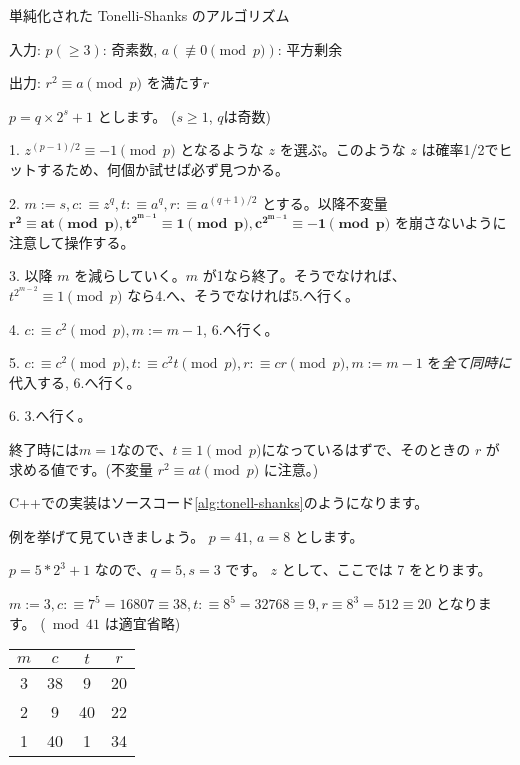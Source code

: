 \documentclass{jsarticle}
\begin{document}
\begin{algorithm}                      
\caption{単純化された Tonelli-Shanks のアルゴリズム}
\label{alg1}
入力: $p (\ge 3)$: 奇素数, $a (\not \equiv 0 \pmod p)$: 平方剰余

出力: $r^2 \equiv a \pmod p$ を満たす$r$

$p = q \times 2^s + 1$ とします。 ($s \ge 1$, $q$は奇数)

1. $z^{(p-1)/2} \equiv -1 \pmod p$ となるような $z$ を選ぶ。このような $z$ は確率1/2でヒットするため、何個か試せば必ず見つかる。

2. $m := s, c:\equiv z^q, t :\equiv a^q, r :\equiv a^{(q + 1)/2}$ とする。以降不変量 $\bm{r^2\equiv at \pmod p, t^{2^{m - 1}} \equiv 1 \pmod p, c^{2^{m-1}} \equiv -1 \pmod p}$ を崩さないように注意して操作する。

3. 以降 $m$ を減らしていく。$m$ が1なら終了。そうでなければ、$t^{2^{m-2}} \equiv 1 \pmod p$ なら4.へ、そうでなければ5.へ行く。

4. $c :\equiv c^2 \pmod p, m := m - 1$, 6.へ行く。

5. $c :\equiv c^2 \pmod p, t :\equiv c^2 t \pmod p, r :\equiv cr \pmod p, m := m - 1$ を\emph{全て同時に}代入する, 6.へ行く。

6. 3.へ行く。

\end{algorithm}
終了時には$m=1$なので、$t\equiv 1 \pmod p$になっているはずで、そのときの $r$ が求める値です。(不変量 $r^2\equiv at \pmod p$ に注意。)



C++での実装はソースコード\ref{alg:tonell-shanks}のようになります。


例を挙げて見ていきましょう。
$p = 41$, $a = 8$ とします。

$p = 5 * 2^3 + 1$ なので、$q = 5, s = 3$ です。
$z$ として、ここでは 7 をとります。

$m := 3, c :\equiv 7^5 = 16807 \equiv 38, t :\equiv 8^5 = 32768 \equiv 9, r \equiv 8^3 = 512 \equiv 20$ となります。 (${} \bmod 41$ は適宜省略)

 \begin{table}[htb]
  \begin{center}
  \begin{tabular}[t]{|c|c|c|c|}
   \hline
   $m$ & $c$ & $t$ & $r$ \\ \hline
   3 & 38 & 9 & 20 \\
   2 & 9 & 40 & 22 \\
   1 & 40 & 1 & 34 \\ \hline
  \end{tabular}
  \end{center}
 \end{table}
\end{document}
